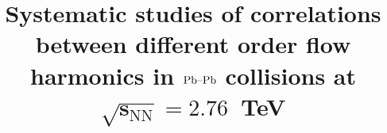 \documentclass[ALICE,manyauthors]{cernphprep}
\begin{document}
%
%

\newcommand{\PbPb}{\textnormal{Pb--Pb}}
\newcommand{\AuAu}{\textnormal{Au--Au}}
\newcommand{\pp}{\ensuremath{\mbox{p}\mbox{p}}}
\newcommand{\snn}{\ensuremath{\sqrt{s_\tn{NN}}}}
\newcommand{\pt}{\ensuremath{p_\tn{T}}}\newcommand{\pT}{\pt}
\newcommand{\CKBNOTE}[1]{{\bf CKB:  #1}} 
\renewcommand{\CKBNOTE}[1]{}  %

\newcommand{\RHNOTE}[1]{{\bf RH:  #1}} 
\renewcommand{\RHNOTE}[1]{}  %

\begin{titlepage}
%
%
%
\title{Systematic studies of correlations between different order flow harmonics in $\PbPb$ collisions at $\mathbf{\sqrt{s_\mathrm{NN}} = 2.76}$~TeV}

%
%
\begin{abstract}


\end{abstract}
\end{titlepage}
\end{document}
